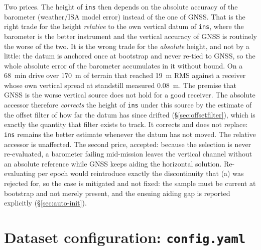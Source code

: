 \documentclass[11pt,a4paper]{article}
\newcommand{\code}[1]{\texttt{#1}}
\begin{document}
\begin{description}
    Two prices. The height of \code{ins} then depends on the absolute
    accuracy of the barometer (weather/ISA model error) instead of the one of
    GNSS. That is the right trade for the height \emph{relative} to the own
    vertical datum of \code{ins}, where the barometer is the better instrument
    and the vertical accuracy of GNSS is routinely the worse of the two. It is
    the wrong trade for the \emph{absolute} height, and not by a little: the
    datum is anchored once at bootstrap and never re-tied to GNSS, so the whole
    absolute error of the barometer accumulates in it without bound. On a
    \SI{68}{\minute} drive over \SI{170}{\metre} of terrain that reached
    \SI{19}{\metre} RMS against a receiver whose own vertical spread at
    standstill measured \SI{0.08}{\metre}. The premise that GNSS is the worse
    vertical source does not hold for a good receiver. The absolute accessor
    therefore \emph{corrects} the height of \code{ins} under this source by the
    estimate of the offset filter of how far the datum has since drifted
    (\S\ref{sec:offsetfilter}), which is exactly the quantity that filter
    exists to track. It corrects and does not replace: \code{ins} remains the
    better estimate whenever the datum has not moved. The relative accessor is
    unaffected.
    The second price, accepted: because the selection is never re-evaluated, a
    barometer failing mid-mission leaves the vertical channel without an absolute
    reference while GNSS keeps aiding the horizontal solution. Re-evaluating per
    epoch would reintroduce exactly the discontinuity that (a) was rejected for,
    so the case is mitigated and not fixed: the sample must be current at
    bootstrap and not merely present, and the ensuing aiding gap is reported
    explicitly (\S\ref{sec:auto-init}).
\end{description}

\section{Dataset configuration: \code{config.yaml}}
\label{sec:configyaml}
\end{document}
